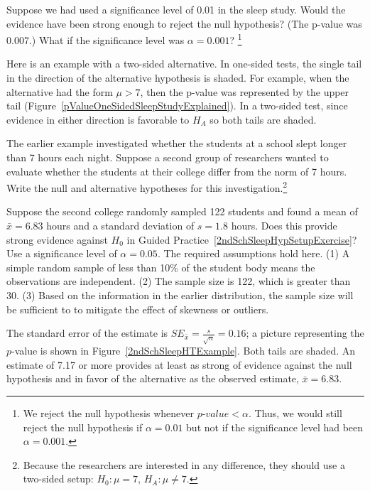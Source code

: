 \begin{spacing}{1.5}
\begin{exercise}
Suppose we had used a significance level of 0.01 in the sleep study. Would the evidence have been strong enough to reject the null hypothesis? (The p-value was 0.007.) What if the significance level was $\alpha = 0.001$? \footnote{We reject the null hypothesis whenever $p$-$value < \alpha$. Thus, we would still reject the null hypothesis if $\alpha = 0.01$ but not if the significance level had been $\alpha = 0.001$.}
\end{exercise}

Here is an example with a two-sided alternative. In one-sided tests, the single tail in the direction of the alternative hypothesis is shaded. For example, when the alternative had the form $\mu > 7$, then the p-value was represented by the upper tail (Figure~\ref{pValueOneSidedSleepStudyExplained}).  In a two-sided test, since evidence in either direction is favorable to $H_A$ so both tails are shaded.

\begin{exercise} \label{2ndSchSleepHypSetupExercise}
The earlier example investigated whether the students at a school slept longer than 7 hours each night. Suppose a second group of researchers wanted to evaluate whether the students at their college differ from the norm of 7 hours. Write the null and alternative hypotheses for this investigation.\footnote{Because the researchers are interested in any difference, they should use a two-sided setup: $H_0: \mu = 7$, $H_A: \mu \neq 7$.}
\end{exercise}

\begin{example}{Suppose the second college randomly sampled 122 students and found a mean of $\bar{x} = 6.83$ hours and a standard deviation of $s=1.8$ hours. Does this provide strong evidence against $H_0$ in Guided Practice~\ref{2ndSchSleepHypSetupExercise}? Use a significance level of $\alpha=0.05$.}
The required assumptions hold here. (1) A simple random sample of less than 10\% of the student body means the observations are independent. (2) The sample size is 122, which is greater than 30. (3) Based on the information in the earlier distribution, the sample size will be sufficient to to mitigate the effect of skewness or outliers.

The standard error of the estimate is $SE_{\bar{x}} = \frac{s}{\sqrt{n}} = 0.16$;  a picture  representing the $p$-value is shown in Figure~\ref{2ndSchSleepHTExample}. Both tails are shaded. An estimate of 7.17 or more provides at least as strong of evidence against the null hypothesis and in favor of the alternative as the observed estimate, $\bar{x} = 6.83$.


\end{example}
\end{spacing}
